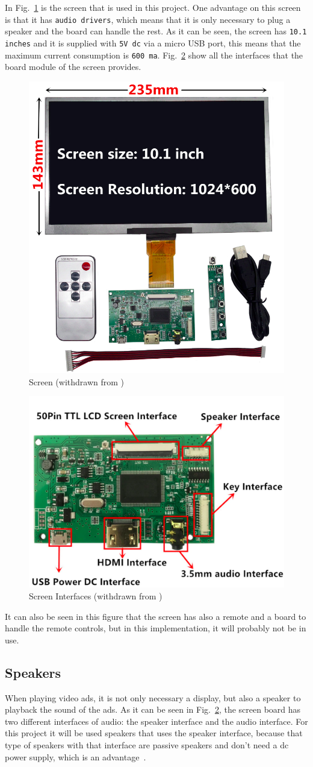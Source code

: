 In Fig.~\ref{fig:screen} is the screen that is used in this project. One advantage on this screen is that it has \texttt{audio drivers}, which means that it is only necessary to plug a speaker and the board can handle the rest.
As it can be seen, the screen has \texttt{10.1 inches} and it is supplied with \texttt{5V \gls{dc}} via a micro USB port, this means that the maximum current consumption is \texttt{600 \gls{ma}}.
Fig.~\ref{fig:screen-interfaces} show all the interfaces that the board module of the screen provides. 
%
\begin{figure}[htb!]
\centering
    \includegraphics[width=0.4\columnwidth]{./img/screen.png}
  \caption{Screen (withdrawn from \cite{screen})}%
\label{fig:screen}
\end{figure}
%
\begin{figure}[htb!]
\centering
    \includegraphics[width=0.4\columnwidth]{./img/screen-interfaces.png}
  \caption{Screen Interfaces (withdrawn from \cite{screen})}%
\label{fig:screen-interfaces}
\end{figure}

It can also be seen in this figure that the screen has also a remote and a board to handle the remote controls, but in this implementation, it will probably not be in use.

\subsection{Speakers}
When playing video ads, it is not only necessary a display, but also a speaker to playback the sound of the ads.
As it can be seen in Fig.~\ref{fig:screen-interfaces}, the screen board has two different interfaces of audio: the speaker interface and the audio interface.
For this project it will be used speakers that uses the speaker interface, because that type of speakers with that interface are passive speakers and don't need a \gls{dc} power supply, which is an advantage~\cite{passive-speaker}.


